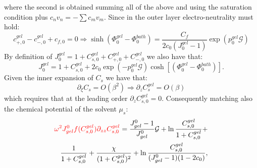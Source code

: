 \documentclass[12pt]{extarticle}
\begin{document}
where the second is obtained summing all of the above and using the saturation condition plus $c_nv_n=-\sum c_mv_m$. 
Since in the outer layer electro-neutrality must hold:
\begin{equation}
c^{gel}_{+,0}-c^{gel}_{-,0}+c_{f,0} =0 \Rightarrow  \sinh(\Phi_0^{gel}-\Phi_0^{bath})= \frac{C_f}{2c_0 (J_0^{gel}-1)}\exp(p_0^{gel}\mathcal{G})\label{eq2}
\end{equation}
By definition of $J^{gel}_0=1+C^{gel}_{s,0}+C^{gel}_{+,0}+C^{gel}_{-,0}$ we also have that:
\begin{equation}
J^{gel}_0=1+C^{gel}_{s,0}+ 2c_0\exp(-p_0^{gel}\mathcal{G})\cosh[(\Phi^{gel}_0-\Phi_0^{bath})]\label{eq3}.
\end{equation}
Given the inner expansion of $C_s$ we have that:
\begin{equation}
\partial_\xi C_s = O(\beta^2) \Rightarrow \partial_z C^{gel}_{s} = O(\beta)
\end{equation}
which requires that at the leading order $\partial_z C^{gel}_{s,0} = 0$.
Consequently matching also the chemical potential of the solvent $\mu_s$:
\begin{equation}
\begin{aligned}
\color{red}\omega^2 J^0_{gel} f(C^{gel}_{s,0})\partial_{zz}C^{gel}_{s,0}\color{black}= \frac{J^0_{gel}-1}{J^0_{gel}} \mathcal{G}  + \ln \frac{C^{gel}_{s,0}}{1+C^{gel}_{s,0}} +\\ \frac{1}{1+C^{gel}_{s,0}}+\frac{\chi}{(1+C^{gel}_{s,0})^2} + \ln \frac{C^{gel}_{s,0}}{(J^0_{gel}-1)(1-2c_0)}, 
\end{aligned}\\[2.5mm]\label{eq4}
\end{equation}
\end{document}
